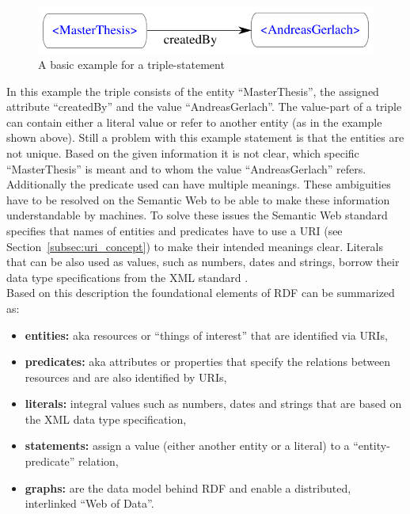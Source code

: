 \begin{figure}[H]
	\centering
		\includegraphics[width=0.8\columnwidth]{images/sample_triple.pdf}
	\caption{A basic example for a triple-statement}
\label{fig:images_semweb_triple}
\end{figure}

In this example the triple consists of the entity ``MasterThesis'', the assigned attribute ``createdBy'' and the value ``AndreasGerlach''. The value-part of a triple can contain either a literal value or refer to another entity (as in the example shown above). Still a problem with this example statement is that the entities are not unique. Based on the given information it is not clear, which specific ``MasterThesis'' is meant and to whom the value ``AndreasGerlach'' refers. Additionally the predicate used can have multiple meanings. These ambiguities have to be resolved on the Semantic Web to be able to make these information understandable by machines. To solve these issues the Semantic Web standard specifies that names of entities and predicates have to use a \gls{URI} (see Section~\ref{subsec:uri_concept}) to make their intended meanings clear. Literals that can be also used as values, such as numbers, dates and strings, borrow their data type specifications from the \gls{XML} standard \citep[pg. 15-38]{wood2014linked}. \\

Based on this description the foundational elements of \gls{RDF} can be summarized as: \@

\begin{itemize}
	\item \textbf{entities:} aka resources or ``things of interest'' that are identified via \gls{URI}s,
	\item \textbf{predicates:} aka attributes or properties that specify the relations between resources and are also identified by \gls{URI}s,
	\item \textbf{literals:} integral values such as numbers, dates and strings that are based on the \gls{XML} data type specification,
	\item \textbf{statements:} assign a value (either another entity or a literal) to a ``entity-predicate'' relation,
	\item \textbf{graphs:} are the data model behind \gls{RDF} and enable a  distributed, interlinked ``Web of Data''.
\end{itemize}

